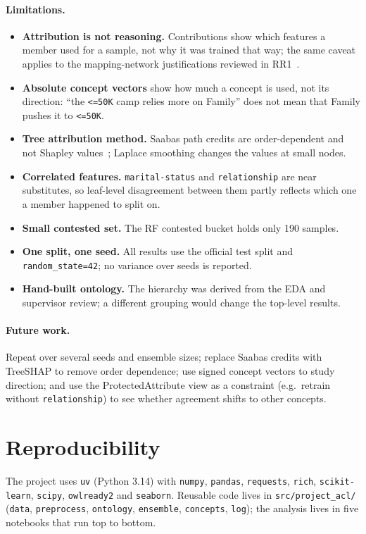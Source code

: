 \documentclass[11pt,a4paper]{article}
\newcommand{\code}[1]{\texttt{#1}}
\newcommand{\concept}[1]{\textsf{#1}}
\begin{document}
\paragraph{Limitations.}
\begin{itemize}
  \item \textbf{Attribution is not reasoning.} Contributions show which features a member used for a sample, not
    why it was trained that way; the same caveat applies to the mapping-network justifications reviewed in
    RR1~\cite{ribeiro2021aligning}.
  \item \textbf{Absolute concept vectors} show how much a concept is used, not its direction: ``the
    \texttt{<=50K} camp relies more on \concept{Family}'' does not mean that \concept{Family} pushes it to
    \texttt{<=50K}.
  \item \textbf{Tree attribution method.} Saabas path credits are order-dependent and not Shapley
    values~\cite{lundberg2017shap}; Laplace smoothing changes the values at small nodes.
  \item \textbf{Correlated features.} \code{marital-status} and \code{relationship} are near substitutes, so leaf-level
    disagreement between them partly reflects which one a member happened to split on.
  \item \textbf{Small contested set.} The RF contested bucket holds only 190 samples.
  \item \textbf{One split, one seed.} All results use the official test split and \code{random\_state=42}; no
    variance over seeds is reported.
  \item \textbf{Hand-built ontology.} The hierarchy was derived from the EDA and supervisor review; a different
    grouping would change the top-level results.
\end{itemize}

\paragraph{Future work.} Repeat over several seeds and ensemble sizes; replace Saabas credits with TreeSHAP to
remove order dependence; use signed concept vectors to study direction; and use the \concept{ProtectedAttribute}
view as a constraint (e.g.\ retrain without \code{relationship}) to see whether agreement shifts to other concepts.

\appendix
\section{Reproducibility}
The project uses \code{uv} (Python 3.14) with \code{numpy}, \code{pandas}, \code{requests}, \code{rich},
\code{scikit-learn}, \code{scipy}, \code{owlready2} and \code{seaborn}. Reusable code lives in
\code{src/project\_acl/} (\code{data}, \code{preprocess}, \code{ontology}, \code{ensemble}, \code{concepts},
\code{log}); the analysis lives in five notebooks that run top to bottom.
\end{document}
